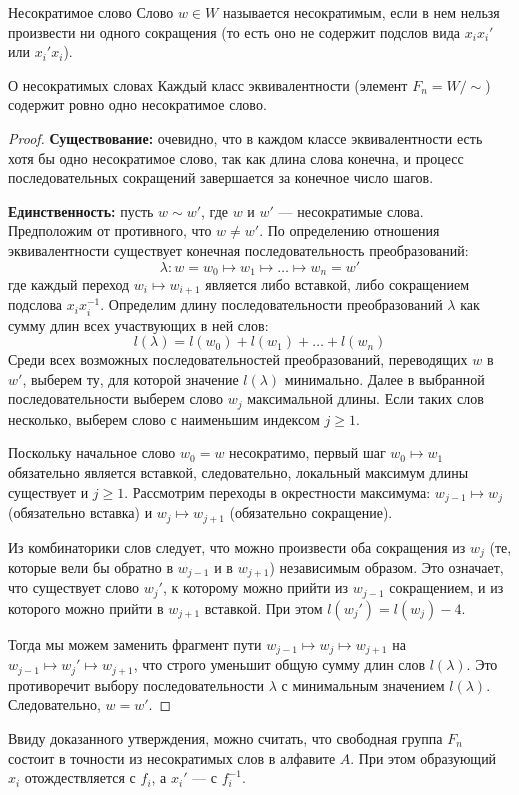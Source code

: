 \begin{Definition}{Несократимое слово}{}
	Слово $w \in W$ называется несократимым, если в нем нельзя произвести ни одного сокращения (то есть оно не содержит подслов вида $x_i x_i'$ или $x_i' x_i$).
\end{Definition}

\begin{Proposition}{О несократимых словах}{}
	Каждый класс эквивалентности (элемент $F_n = W / \sim$) содержит ровно одно несократимое слово.
\end{Proposition}

\begin{proof}
	\textbf{Существование:} очевидно, что в каждом классе эквивалентности есть хотя бы одно несократимое слово, так как длина слова конечна, и процесс последовательных сокращений завершается за конечное число шагов.

	\textbf{Единственность:} пусть $w \sim w'$, где $w$ и $w'$ — несократимые слова. Предположим от противного, что $w \neq w'$. По определению отношения эквивалентности существует конечная последовательность преобразований:
	\[ \lambda: w = w_0 \mapsto w_1 \mapsto \dots \mapsto w_n = w' \]
	где каждый переход $w_i \mapsto w_{i+1}$ является либо вставкой, либо сокращением подслова $x_i x_i^{-1}$. Определим длину последовательности преобразований $\lambda$ как сумму длин всех участвующих в ней слов:
	\[ l(\lambda) = l(w_0) + l(w_1) + \dots + l(w_n) \]
	Среди всех возможных последовательностей преобразований, переводящих $w$ в $w'$, выберем ту, для которой значение $l(\lambda)$ минимально. Далее в выбранной последовательности выберем слово $w_j$ максимальной длины. Если таких слов несколько, выберем слово с наименьшим индексом $j \ge 1$.

	Поскольку начальное слово $w_0 = w$ несократимо, первый шаг $w_0 \mapsto w_1$ обязательно является вставкой, следовательно, локальный максимум длины существует и $j \ge 1$. Рассмотрим переходы в окрестности максимума: $w_{j-1} \mapsto w_j$ (обязательно вставка) и $w_j \mapsto w_{j+1}$ (обязательно сокращение).

	Из комбинаторики слов следует, что можно произвести оба сокращения из $w_j$ (те, которые вели бы обратно в $w_{j-1}$ и в $w_{j+1}$) независимым образом. Это означает, что существует слово $w_j'$, к которому можно прийти из $w_{j-1}$ сокращением, и из которого можно прийти в $w_{j+1}$ вставкой. При этом $l(w_j') = l(w_j) - 4$.

	Тогда мы можем заменить фрагмент пути $w_{j-1} \mapsto w_j \mapsto w_{j+1}$ на $w_{j-1} \mapsto w_j' \mapsto w_{j+1}$, что строго уменьшит общую сумму длин слов $l(\lambda)$. Это противоречит выбору последовательности $\lambda$ с минимальным значением $l(\lambda)$. Следовательно, $w = w'$.
\end{proof}

\begin{Remark}{}{}
	Ввиду доказанного утверждения, можно считать, что свободная группа $F_n$ состоит в точности из несократимых слов в алфавите $A$. При этом образующий $x_i$ отождествляется с $f_i$, а $x_i'$ — с $f_i^{-1}$.
\end{Remark}
